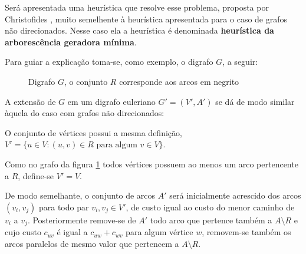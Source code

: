         Será apresentada uma heurística que resolve esse problema, proposta por Christofides \cite{christofides-86}, muito semelhente à heurística apresentada para o caso de grafos não direcionados.
        Nesse caso ela a heurística é denominada \textbf{heurística da arborescência geradora mínima}.

        Para guiar a explicação toma-se, como exemplo, o digrafo $G$, a seguir:
   

        \begin{figure}[H]
            \centering
            \caption{Digrafo $G$, o conjunto $R$ corresponde aos arcos em negrito}
            \label{pcr-digraph}
        \end{figure}

        A extensão de $G$ em um digrafo euleriano $G' = (V', A')$ se dá de modo similar àquela do caso com grafos não direcionados:

        O conjunto de vértices possui a mesma definição, $V' = \{u \in V : (u, v) \in R \text{ para algum } v \in V\}$. 

        Como no grafo da figura \ref{pcr-digraph} todos vértices possuem ao menos um arco pertencente a $R$, define-se $V' = V$.

        De modo semelhante, o conjunto de arcos $A'$ será inicialmente acrescido dos arcos $(v_i, v_j)$ para todo par $v_i, v_j \in V'$, de custo igual ao custo do menor caminho de $v_i$ a $v_j$.
        Posteriormente remove-se de $A'$ todo arco que pertence também a $A \setminus R$ e cujo custo $c_{uv}$ é igual a $c_{uw} + c_{wv}$ para algum vértice $w$, removem-se também os arcos paralelos de mesmo valor que pertencem a $A \setminus R$.

